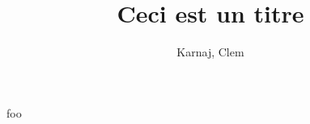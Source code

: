 \documentclass[small]{zmdocument}
\title{Ceci est un titre}
\author{Karnaj, Clem}
\begin{document}
   \maketitle
   \toc

   foo \\
\end{document}
